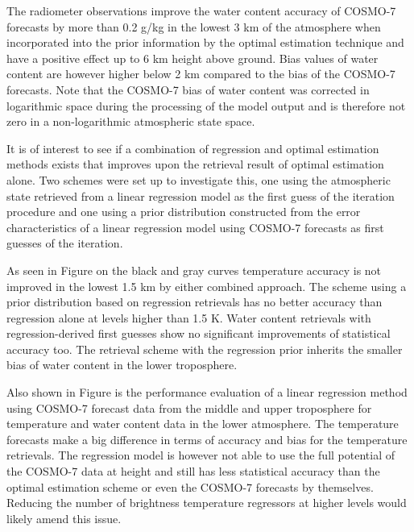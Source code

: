     The radiometer observations improve the water content accuracy of COSMO-7
    forecasts by more than 0.2 g/kg in the lowest 3 km of the atmosphere when
    incorporated into the prior information by the optimal estimation technique
    and have a positive effect up to 6 km height above ground. Bias values of
    water content are however higher below 2 km compared to the bias of the
    COSMO-7 forecasts. Note that the COSMO-7 bias of water content was
    corrected in logarithmic space during the processing of the model output
    and is therefore not zero in a non-logarithmic atmospheric state space.

\stopsubsection

\startsubsection[title={Combined Approaches}]

    It is of interest to see if a combination of regression and optimal
    estimation methods exists that improves upon the retrieval result of
    optimal estimation alone. Two schemes were set up to investigate this,
    one using the atmospheric state retrieved from a linear regression model
    as the first guess of the iteration procedure and one using a prior
    distribution constructed from the error characteristics of a linear
    regression model using COSMO-7 forecasts as first guesses of the iteration.

    As seen in Figure  on the black and gray curves
    temperature accuracy is not improved in the lowest 1.5 km by either
    combined approach. The scheme using a prior distribution based on
    regression retrievals has no better accuracy than regression alone at
    levels higher than 1.5 K. Water content retrievals with regression-derived
    first guesses show no significant improvements of statistical accuracy too.
    The retrieval scheme with the regression prior inherits the smaller
    bias of water content in the lower troposphere.

    Also shown in Figure  is the performance evaluation of
    a linear regression method using COSMO-7 forecast data from the middle and
    upper troposphere for temperature and water content data in the lower
    atmosphere. The temperature forecasts make a big difference in terms of
    accuracy and bias for the temperature retrievals. The regression model
    is however not able to use the full potential of the COSMO-7 data at
    height and still has less statistical accuracy than the optimal estimation
    scheme or even the COSMO-7 forecasts by themselves. Reducing the number of
    brightness temperature regressors at higher levels would likely amend this
    issue.

